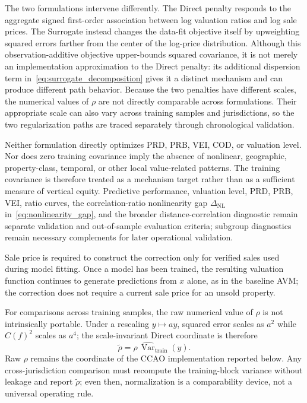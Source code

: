 \documentclass[10pt]{article}
\theoremstyle{definition}
\newcommand{\Var}{\operatorname{Var}}
\newcommand{\1}{\mathbf{1}}
\begin{document}
{
The two formulations intervene differently. The Direct penalty responds to the aggregate signed first-order association between log valuation ratios and log sale prices. The Surrogate instead changes the data-fit objective itself by upweighting squared errors farther from the center of the log-price distribution. Although this observation-additive objective upper-bounds squared covariance, it is not merely an implementation approximation to the Direct penalty: its additional dispersion term in~\eqref{eq:surrogate_decomposition} gives it a distinct mechanism and can produce different path behavior. Because the two penalties have different scales, the numerical values of $\rho$ are not directly comparable across formulations. Their appropriate scale can also vary across training samples and jurisdictions, so the two regularization paths are traced separately through chronological validation.}


{Neither formulation directly optimizes PRD, PRB, VEI, COD, or valuation level. Nor does zero training covariance imply the absence of nonlinear, geographic, property-class, temporal, or other local value-related patterns. The training covariance is therefore treated as a mechanism target rather than as a sufficient measure of vertical equity. Predictive performance, valuation level, PRD, PRB, VEI, ratio curves, the correlation-ratio nonlinearity gap $\Delta_{\mathrm{NL}}$ in~\eqref{eq:nonlinearity_gap}, and the broader distance-correlation diagnostic remain separate validation and out-of-sample evaluation criteria; subgroup diagnostics remain necessary complements for later operational validation.}

{Sale price is required to construct the correction only for verified sales used during model fitting. Once a model has been trained, the resulting valuation function continues to generate predictions from $x$ alone, as in the baseline AVM; the correction does not require a current sale price for an unsold property.}

For comparisons across training samples, the raw numerical value of $\rho$ is not intrinsically portable. Under a rescaling $y\mapsto ay$, squared error scales as $a^2$ while $C(f)^2$ scales as $a^4$; the scale-invariant Direct coordinate is therefore
\begin{equation}
\label{eq:normalized_rho}
\widetilde\rho=\rho\,\widehat{\Var}_{\mathrm{train}}(y).
\end{equation}
Raw $\rho$ remains the coordinate of the CCAO implementation reported below. Any cross-jurisdiction comparison must recompute the training-block variance without leakage and report $\widetilde\rho$; even then, normalization is a comparability device, not a universal operating rule.
\end{document}
